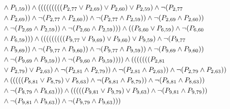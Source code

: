 \documentclass[10pt]{article}
\begin{document}
\begin{align*}
& \land P_{1,59})) \land (((((((((P_{2,77} \lor P_{2,69}) \lor P_{2,60}) \lor P_{2,59}) \land \lnot(P_{2,77} \\
& \land P_{2,69})) \land \lnot(P_{2,77} \land P_{2,60})) \land \lnot(P_{2,77} \land P_{2,59})) \land \lnot(P_{2,69} \land P_{2,60})) \\
& \land \lnot(P_{2,69} \land P_{2,59})) \land \lnot(P_{2,60} \land P_{2,59}))) \land ((P_{6,60} \lor P_{6,59}) \land \lnot(P_{6,60} \\
& \land P_{6,59}))) \land (((((((((P_{9,77} \lor P_{9,69}) \lor P_{9,60}) \lor P_{9,59}) \land \lnot(P_{9,77} \\
& \land P_{9,69})) \land \lnot(P_{9,77} \land P_{9,60})) \land \lnot(P_{9,77} \land P_{9,59})) \land \lnot(P_{9,69} \land P_{9,60})) \\
& \land \lnot(P_{9,69} \land P_{9,59})) \land \lnot(P_{9,60} \land P_{9,59})))) \land (((((((P_{2,81} \\
& \lor P_{2,79}) \lor P_{2,63}) \land \lnot(P_{2,81} \land P_{2,79})) \land \lnot(P_{2,81} \land P_{2,63})) \land \lnot(P_{2,79} \land P_{2,63})) \\
& \land (((((P_{8,81} \lor P_{8,79}) \lor P_{8,63}) \land \lnot(P_{8,81} \land P_{8,79})) \land \lnot(P_{8,81} \land P_{8,63})) \\
& \land \lnot(P_{8,79} \land P_{8,63}))) \land (((((P_{9,81} \lor P_{9,79}) \lor P_{9,63}) \land \lnot(P_{9,81} \land P_{9,79})) \\
& \land \lnot(P_{9,81} \land P_{9,63})) \land \lnot(P_{9,79} \land P_{9,63})))
\end{align*}

\end{document}
